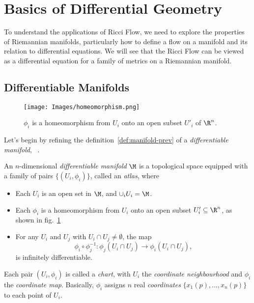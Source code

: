 \section{Basics of Differential Geometry}
To understand the applications of Ricci Flow, we need to explore the properties of Riemannian manifolds, particularly how to define a flow on a manifold and its relation to differential equations. We will see that the Ricci Flow can be viewed as a differential equation for a family of metrics on a Riemannian manifold.


\subsection{Differentiable Manifolds}
\begin{figure}
	\centering
	\texttt{[image: Images/homeomorphism.png]}
	\caption{$\phi_i$ is a homeomorphism from $U_i$ onto an open subset $U'_i$ of $\R^n$.}
	\label{fig:homeomorphism}
\end{figure}

Let's begin by refining the definition~\ref{def:manifold-prev} of a \emph{differentiable manifold}, ~\cite{lee:smooth,tu:manifolds}.

\begin{definition}
	An $n$-dimensional \emph{differentiable manifold} $\M$ is a topological space equipped with a family of pairs $\{ (U_i, \phi_i) \}$, called an \emph{atlas}, where
	\begin{itemize}
		\item Each $U_i$ is an open set in $\M$, and $\cup_i U_i = \M$.
		\item Each $\phi_i$ is a homeomorphism from $U_i$ onto an open subset $U_i'\subseteq \R^n$, as shown in fig.~\ref{fig:homeomorphism}
		\item For any $U_i$ and $U_j$ with $U_i \cap U_j \neq \emptyset$, the map
		      \begin{equation*}
			      \phi_i \circ \phi_j^{-1} \colon \phi_j (U_i \cap U_j) \to \phi_i(U_i \cap U_j),
		      \end{equation*}
		      is infinitely differentiable.
	\end{itemize}
\end{definition}

Each pair $(U_i, \phi_i)$ is called a \emph{chart}, with $U_i$ the \emph{coordinate neighbourhood} and $\phi_i$ the \emph{coordinate map}. Basically, $\phi_i$ assigns $n$ real \emph{coordinates} $\{x_1(p), \dots, x_n(p)\}$ to each point of $U_i$.

